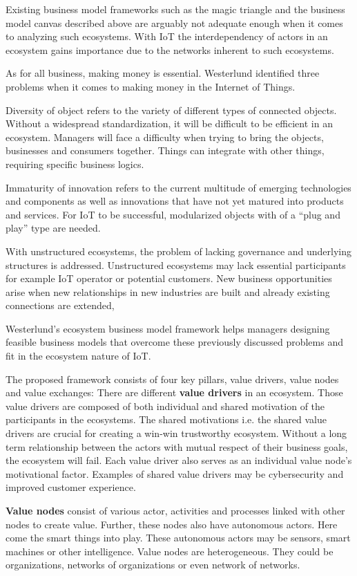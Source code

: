 		Existing business model frameworks such as the magic triangle and the business model canvas described above are arguably not adequate enough when it comes to analyzing such ecosystems. With IoT the interdependency of actors in an ecosystem gains importance due to the networks inherent to such ecosystems.

		As for all business, making money is essential. Westerlund identified three problems when it comes to making money in the Internet of Things.

		Diversity of object refers to the variety of different types of connected objects. Without a widespread standardization, it will be difficult to be efficient in an ecosystem. Managers will face a difficulty when trying to bring the objects, businesses and consumers together. Things can integrate with other things, requiring specific business logics.

		Immaturity of innovation refers to the current multitude of emerging technologies and components as well as innovations that have not yet matured into products and services. For IoT to be successful, modularized objects with of a ``plug and play'' type are needed.

		With unstructured ecosystems, the problem of lacking governance and underlying structures is addressed. Unstructured ecosystems may lack essential participants for example IoT operator or potential customers. New business opportunities arise when new relationships in new industries are built and already existing connections are extended,

		Westerlund's ecosystem business model framework helps managers designing feasible business models that overcome these previously discussed problems and fit in the ecosystem nature of IoT. 

		The proposed framework consists of four key pillars, value drivers, value nodes and value exchanges:
		There are different \textbf{value drivers} in an ecosystem. Those value drivers are composed of both individual and shared motivation of the participants in the ecosystems. The shared motivations i.e. the shared value drivers are crucial for creating a win-win trustworthy ecosystem. Without a long term relationship between the actors with mutual respect of their business goals, the ecosystem will fail. Each value driver also serves as an individual value node's motivational factor. Examples of shared value drivers may be cybersecurity and improved customer experience.

		\textbf{Value nodes} consist of various actor, activities and processes linked with other nodes to create value. Further, these nodes also have autonomous actors. Here come the smart things into play. These autonomous actors may be sensors, smart machines or other intelligence. Value nodes are heterogeneous. They could be organizations, networks of organizations or even network of networks.

